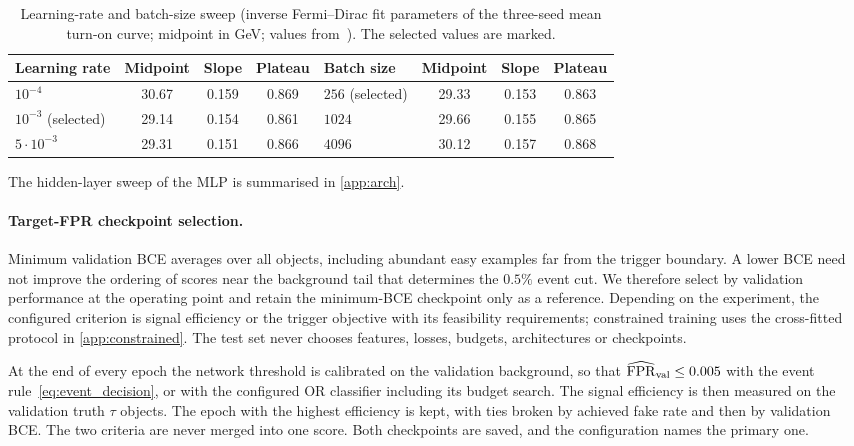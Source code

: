 \begin{table}[ht]
  \centering
  \caption{Learning-rate and batch-size sweep (inverse Fermi--Dirac fit parameters of the three-seed mean turn-on curve; midpoint in GeV; values from~\cite{kernan2026}). The selected values are marked.}
  \label{tab:lr_sweep}
  \small
  \begin{tabular}{@{}lccc@{\qquad\qquad}lccc@{}}
    \toprule
    Learning rate & Midpoint & Slope & Plateau & Batch size & Midpoint & Slope & Plateau \\
    \midrule
    $10^{-4}$             & 30.67 & 0.159 & 0.869 & $256$ (selected) & 29.33 & 0.153 & 0.863 \\
    $10^{-3}$ (selected)  & 29.14 & 0.154 & 0.861 & $1024$           & 29.66 & 0.155 & 0.865 \\
    $5\cdot10^{-3}$       & 29.31 & 0.151 & 0.866 & $4096$           & 30.12 & 0.157 & 0.868 \\
    \bottomrule
  \end{tabular}
\end{table}

The hidden-layer sweep of the MLP is summarised in \cref{app:arch}.

\paragraph{Target-FPR checkpoint selection.}
Minimum validation BCE averages over all objects, including abundant easy examples far from the trigger boundary. A lower BCE need not improve the ordering of scores near the background tail that determines the $0.5\%$ event cut. We therefore select by validation performance at the operating point and retain the minimum-BCE checkpoint only as a reference. Depending on the experiment, the configured criterion is signal efficiency or the trigger objective with its feasibility requirements; constrained training uses the cross-fitted protocol in \cref{app:constrained}. The test set never chooses features, losses, budgets, architectures or checkpoints.

At the end of every epoch the network threshold is calibrated on the validation background, so that $\widehat{\mathrm{FPR}}_{\mathrm{val}}\leq0.005$ with the event rule~\eqref{eq:event_decision}, or with the configured OR classifier including its budget search. The signal efficiency is then measured on the validation truth $\tau$ objects. The epoch with the highest efficiency is kept, with ties broken by achieved fake rate and then by validation BCE. The two criteria are never merged into one score. Both checkpoints are saved, and the configuration names the primary one.

